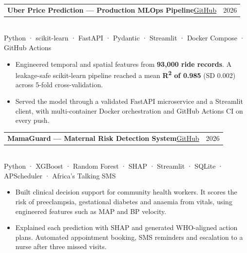 \documentclass[10pt,a4paper]{article}
\makeatletter
\newcommand{\meta}[1]{{\color{muted}#1}}
\newcommand{\project}[5]{%
  \begin{tabularx}{\linewidth}{@{}X r@{}}
    {\fontsize{10.5}{12.5}\selectfont\bfseries #1}\hspace{0.5em}\href{#3}{\color{accent}\small #2} & \meta{#4} \\
  \end{tabularx}\\[-1pt]
  {\color{muted}\small #5}\par
}
\makeatother
\begin{document}
\vspace{3pt}
\project{Uber Price Prediction — Production MLOps Pipeline}{GitHub}{https://github.com/Calvin-Gacheru/Uber-Price-Prediction}{2026}
  {Python · scikit-learn · FastAPI · Pydantic · Streamlit · Docker Compose · GitHub Actions}
\begin{itemize}
  \item Engineered temporal and spatial features from \textbf{93,000 ride records}. A leakage-safe scikit-learn pipeline reached a mean \textbf{R\textsuperscript{2} of 0.985} (SD 0.002) across 5-fold cross-validation.
  \item Served the model through a validated FastAPI microservice and a Streamlit client, with multi-container Docker orchestration and GitHub Actions CI on every push.
\end{itemize}

\vspace{3pt}
\project{MamaGuard — Maternal Risk Detection System}{GitHub}{https://github.com/Calvin-Gacheru/Maternal-Risk-Detection-System}{2026}
  {Python · XGBoost · Random Forest · SHAP · Streamlit · SQLite · APScheduler · Africa's Talking SMS}
\begin{itemize}
  \item Built clinical decision support for community health workers. It scores the risk of preeclampsia, gestational diabetes and anaemia from vitals, using engineered features such as MAP and BP velocity.
  \item Explained each prediction with SHAP and generated WHO-aligned action plans. Automated appointment booking, SMS reminders and escalation to a nurse after three missed visits.
\end{itemize}

\end{document}
